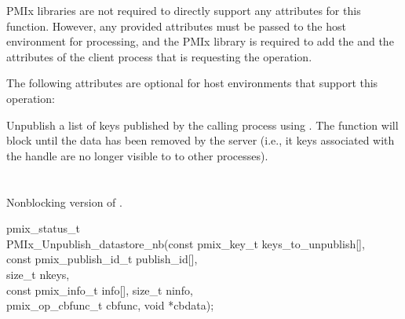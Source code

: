 \returnsimple

\reqattrstart
\ac{PMIx} libraries are not required to directly support any attributes for this function. However, any provided attributes must be passed to the host environment for processing, and the \ac{PMIx} library is required to add the  and the  attributes of the client process that is requesting the operation.

\reqattrend

\optattrstart
The following attributes are optional for host environments that support this operation:


\optattrend

\descr

Unpublish a list of keys published by the calling process using .
The function will block until the data has been removed by the server (i.e., it keys associated with the handle are no longer visible to to other processes).


\section{}

\summary

Nonblocking version of .

\format

\cspecificstart
\begin{codepar}
pmix_status_t \\
PMIx_Unpublish_datastore_nb(const pmix_key_t keys_to_unpublish[], \\
\hspace*{15\sigspace}const pmix_publish_id_t publish_id[], \\
\hspace*{15\sigspace}size_t nkeys, \\
\hspace*{15\sigspace}const pmix_info_t info[], size_t ninfo, \\
\hspace*{18\sigspace}pmix_op_cbfunc_t cbfunc, void *cbdata);
\end{codepar}
\cspecificend

